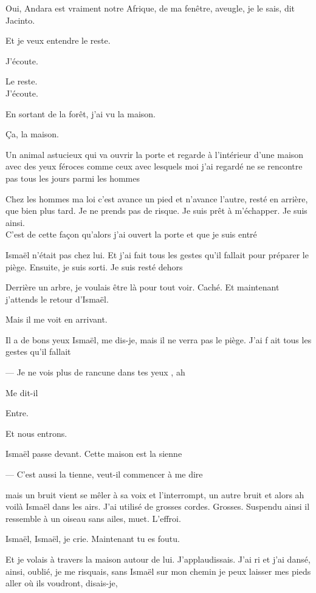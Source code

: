 Oui, Andara est vraiment notre Afrique, de ma fenêtre, aveugle, je le
sais, dit Jacinto.

Et je veux entendre le reste.

J'écoute.

Le reste.\\

J'écoute.

En sortant de la forêt, j'ai vu la maison.

Ça, la maison.

Un animal astucieux qui va ouvrir la porte et regarde à l'intérieur
d'une maison avec des yeux féroces comme ceux avec lesquels moi j'ai
regardé ne se rencontre pas tous les jours parmi les hommes

Chez les hommes ma loi c'est avance un pied et n'avance l'autre, resté
en arrière, que bien plus tard. Je ne prends pas de risque. Je suis prêt
à m'échapper. Je suis ainsi.\\

C'est de cette façon qu'alors j'ai ouvert la porte et que je suis entré

Ismaël n'était pas chez lui. Et j'ai fait tous les gestes qu'il fallait
pour préparer le piège. Ensuite, je suis sorti. Je suis resté dehors

Derrière un arbre, je voulais être là pour tout voir. Caché. Et
maintenant j'attends le retour d'Ismaël.

Mais il me voit en arrivant.

Il a de bons yeux Ismaël, me dis-je, mais il ne verra pas le piège. J'ai
f ait tous les gestes qu'il fallait

--- Je ne vois plus de rancune dans tes yeux , ah

Me dit-il

Entre.

Et nous entrons.

Ismaël passe devant. Cette maison est la sienne

--- C'est aussi la tienne, veut-il commencer à me dire

mais un bruit vient se mêler à sa voix et l'interrompt, un autre bruit
et alors ah voilà Ismaël dans les airs. J'ai utilisé de grosses cordes.
Grosses. Suspendu ainsi il ressemble à un oiseau sans ailes, muet.
L'effroi.

Ismaël, Ismaël, je crie. Maintenant tu es foutu.

Et je volais à travers la maison autour de lui. J'applaudissais. J'ai ri
et j'ai dansé, ainsi, oublié, je me risquais, sans Ismaël sur mon chemin
je peux laisser mes pieds aller où ils voudront, disais-je,

